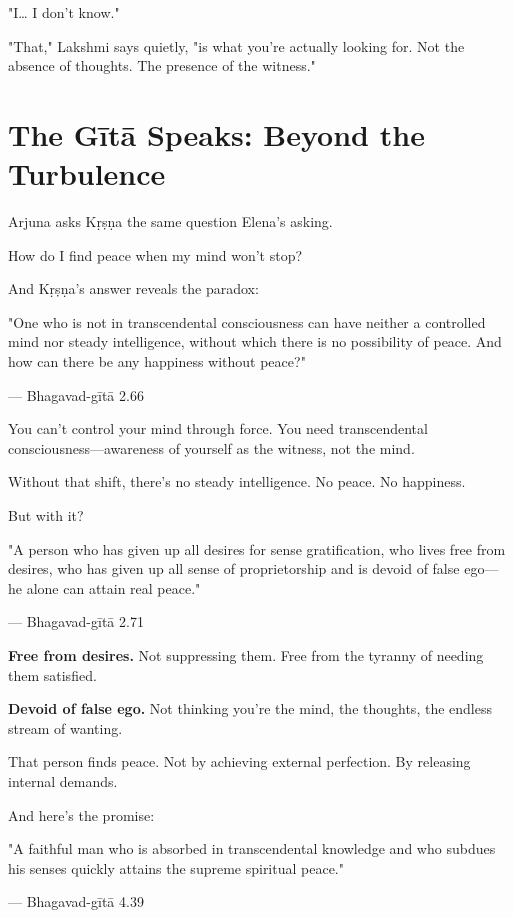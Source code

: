 \documentclass[11pt,twoside]{book}
\begin{document}
"I\ldots{} I don't know."

"That," Lakshmi says quietly, "is what you're actually looking for. Not the absence of thoughts. The presence of the witness."

\section*{The Gītā Speaks: Beyond the Turbulence}

Arjuna asks Kṛṣṇa the same question Elena's asking.

How do I find peace when my mind won't stop?

And Kṛṣṇa's answer reveals the paradox:

\begin{pullquote}
"One who is not in transcendental consciousness can have neither a controlled mind nor steady intelligence, without which there is no possibility of peace. And how can there be any happiness without peace?"

--- Bhagavad-gītā 2.66
\end{pullquote}

You can't control your mind through force. You need transcendental consciousness—awareness of yourself as the witness, not the mind.

Without that shift, there's no steady intelligence. No peace. No happiness.

But with it?

\begin{pullquote}
"A person who has given up all desires for sense gratification, who lives free from desires, who has given up all sense of proprietorship and is devoid of false ego—he alone can attain real peace."

--- Bhagavad-gītā 2.71
\end{pullquote}

\textbf{\textbf{Free from desires.}} Not suppressing them. Free from the tyranny of needing them satisfied.

\textbf{\textbf{Devoid of false ego.}} Not thinking you're the mind, the thoughts, the endless stream of wanting.

That person finds peace. Not by achieving external perfection. By releasing internal demands.

And here's the promise:

\begin{pullquote}
"A faithful man who is absorbed in transcendental knowledge and who subdues his senses quickly attains the supreme spiritual peace."

--- Bhagavad-gītā 4.39
\end{pullquote}
\end{document}
